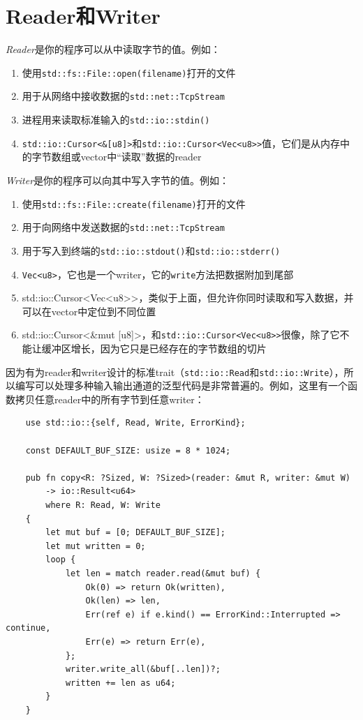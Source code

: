 \section{Reader和Writer}

\emph{Reader}是你的程序可以从中读取字节的值。例如：
\begin{enumerate}
    \item 使用\texttt{std::fs::File::open(filename)}打开的文件
    \item 用于从网络中接收数据的\texttt{std::net::TcpStream}
    \item 进程用来读取标准输入的\texttt{std::io::stdin()}
    \item \texttt{std::io::Cursor<\&[u8]>}和\texttt{std::io::Cursor<Vec<u8>>}值，它们是从内存中的字节数组或vector中“读取”数据的reader
\end{enumerate}

\emph{Writer}是你的程序可以向其中写入字节的值。例如：
\begin{enumerate}
    \item 使用\texttt{std::fs::File::create(filename)}打开的文件
    \item 用于向网络中发送数据的\texttt{std::net::TcpStream}
    \item 用于写入到终端的\texttt{std::io::stdout()}和\texttt{std::io::stderr()}
    \item \texttt{Vec<u8>}，它也是一个writer，它的\texttt{write}方法把数据附加到尾部
    \item std::io::Cursor<Vec<u8>>，类似于上面，但允许你同时读取和写入数据，并可以在vector中定位到不同位置
    \item std::io::Cursor<\&mut [u8]>，和\texttt{std::io::Cursor<Vec<u8>>}很像，除了它不能让缓冲区增长，因为它只是已经存在的字节数组的切片
\end{enumerate}

因为有为reader和writer设计的标准trait（\texttt{std::io::Read}和\texttt{std::io::Write}），所以编写可以处理多种输入输出通道的泛型代码是非常普遍的。例如，这里有一个函数拷贝任意reader中的所有字节到任意writer：
\begin{verbatim}
    use std::io::{self, Read, Write, ErrorKind};

    const DEFAULT_BUF_SIZE: usize = 8 * 1024;

    pub fn copy<R: ?Sized, W: ?Sized>(reader: &mut R, writer: &mut W)
        -> io::Result<u64>
        where R: Read, W: Write
    {
        let mut buf = [0; DEFAULT_BUF_SIZE];
        let mut written = 0;
        loop {
            let len = match reader.read(&mut buf) {
                Ok(0) => return Ok(written),
                Ok(len) => len,
                Err(ref e) if e.kind() == ErrorKind::Interrupted => continue,
                Err(e) => return Err(e),
            };
            writer.write_all(&buf[..len])?;
            written += len as u64;
        }
    }
\end{verbatim}

